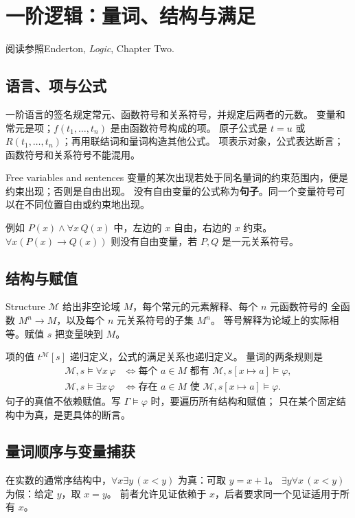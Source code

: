 \chapter{一阶逻辑：量词、结构与满足}
\begin{qlnote}{阅读参照}Enderton, \emph{Logic}, Chapter Two.\end{qlnote}

\section{语言、项与公式}
一阶语言的签名规定常元、函数符号和关系符号，并规定后两者的元数。
变量和常元是项；\(f(t_1,\ldots,t_n)\) 是由函数符号构成的项。
原子公式是 \(t=u\) 或 \(R(t_1,\ldots,t_n)\)；再用联结词和量词构造其他公式。
项表示对象，公式表达断言；函数符号和关系符号不能混用。

\begin{definition}{Free variables and sentences}
变量的某次出现若处于同名量词的约束范围内，便是约束出现；否则是自由出现。
没有自由变量的公式称为\textbf{句子}。同一个变量符号可以在不同位置自由或约束地出现。
\end{definition}
例如 \(P(x)\land\forall x\,Q(x)\) 中，左边的 \(x\) 自由，右边的 \(x\) 约束。
\(\forall x(P(x)\to Q(x))\) 则没有自由变量，若 \(P,Q\) 是一元关系符号。

\section{结构与赋值}
\begin{definition}{Structure}
\(\mathcal M\) 给出非空论域 \(M\)，每个常元的元素解释、每个 \(n\) 元函数符号的
全函数 \(M^n\to M\)，以及每个 \(n\) 元关系符号的子集 \(M^n\)。
等号解释为论域上的实际相等。赋值 \(s\) 把变量映到 \(M\)。
\end{definition}
项的值 \(t^{\mathcal M}[s]\) 递归定义，公式的满足关系也递归定义。
量词的两条规则是
\[
\begin{aligned}
\mathcal M,s\models\forall x\,\varphi
 &\Longleftrightarrow \text{每个 }a\in M\text{ 都有 }\mathcal M,s[x\mapsto a]\models\varphi,\\
\mathcal M,s\models\exists x\,\varphi
 &\Longleftrightarrow \text{存在 }a\in M\text{ 使 }\mathcal M,s[x\mapsto a]\models\varphi.
\end{aligned}
\]
句子的真值不依赖赋值。写 \(\Gamma\models\varphi\) 时，要遍历所有结构和赋值；
只在某个固定结构中为真，是更具体的断言。

\section{量词顺序与变量捕获}
\begin{example}[见证是否可以随输入变化]
在实数的通常序结构中，\(\forall x\exists y\,(x<y)\) 为真：可取 \(y=x+1\)。
\(\exists y\forall x\,(x<y)\) 为假：给定 \(y\)，取 \(x=y\)。
前者允许见证依赖于 \(x\)，后者要求同一个见证适用于所有 \(x\)。
\end{example}

